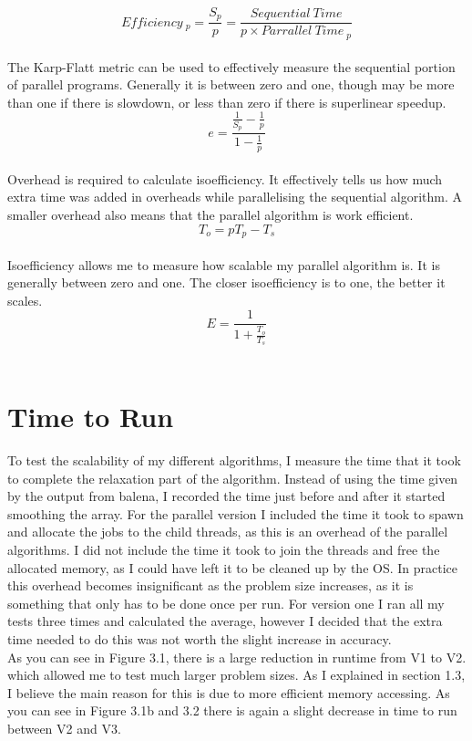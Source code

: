 \documentclass{report}
\begin{document}
$$Efficiency\ _p=\frac{S_p}{p}=\frac{Sequential\ Time}{p\times Parrallel\ Time\ _p}$$\\

The Karp-Flatt metric can be used to effectively measure the sequential portion of parallel programs. Generally it is between zero and one, though may be more than one if there is slowdown, or less than zero if there is superlinear speedup.\\

$$e=\frac{\frac{1}{S_p}-\frac{1}{p}}{1-\frac{1}{p}}$$\\

Overhead is required to calculate isoefficiency. It effectively tells us how much extra time was added in overheads while parallelising the sequential algorithm. A smaller overhead also means that the parallel algorithm is work efficient.\\

$$T_o=pT_p - T_s$$\\

Isoefficiency allows me to measure how scalable my parallel algorithm is. It is generally between zero and one. The closer isoefficiency is to one, the better it scales.\\

$$E=\frac{1}{1+\frac{T_o}{T_s}}$$\\
\section{Time to Run}
To test the scalability of my different algorithms, I measure the time that it took to complete the relaxation part of the algorithm. Instead of using the time given by the output from balena, I recorded the time just before and after it started smoothing the array. For the parallel version I included the time it took to spawn and allocate the jobs to the child threads, as this is an overhead of the parallel algorithms. I did not include the time it took to join the threads and free the allocated memory, as I could have left it to be cleaned up by the OS. In practice this overhead becomes insignificant as the problem size increases, as it is something that only has to be done once per run. For version one I ran all my tests three times and calculated the average, however I decided that the extra time needed to do this was not worth the slight increase in accuracy.\\

As you can see in Figure 3.1, there is a large reduction in runtime from V1 to V2. which allowed me to test much larger problem sizes. As I explained in section 1.3,  I believe the main reason for this is due to more efficient memory accessing. As you can see in Figure 3.1b and 3.2 there is again a slight decrease in time to run between V2 and V3.
\end{document}

